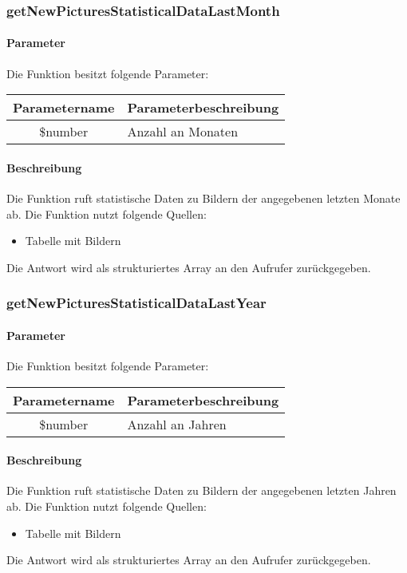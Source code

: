 \subsubsection{getNewPicturesStatisticalDataLastMonth}
\paragraph{Parameter} Die Funktion besitzt folgende Parameter:
\begin{table}[H]
	\begin{tabular}{|c|p{11cm}|}
		\hline
		\textbf{Parametername} & \textbf{Parameterbeschreibung} \\ \hline
		\$number & Anzahl an Monaten \\ \hline
	\end{tabular}
\end{table}
\paragraph{Beschreibung} Die Funktion ruft statistische Daten zu Bildern der angegebenen letzten Monate ab. Die Funktion nutzt folgende Quellen:
\begin{itemize}
	\item Tabelle mit Bildern
\end{itemize}
Die Antwort wird als strukturiertes Array an den Aufrufer zurückgegeben.
\subsubsection{getNewPicturesStatisticalDataLastYear}
\paragraph{Parameter} Die Funktion besitzt folgende Parameter:
\begin{table}[H]
	\begin{tabular}{|c|p{11cm}|}
		\hline
		\textbf{Parametername} & \textbf{Parameterbeschreibung} \\ \hline
		\$number & Anzahl an Jahren \\ \hline
	\end{tabular}
\end{table}
\paragraph{Beschreibung} Die Funktion ruft statistische Daten zu Bildern der angegebenen letzten Jahren ab. Die Funktion nutzt folgende Quellen:
\begin{itemize}
	\item Tabelle mit Bildern
\end{itemize}
Die Antwort wird als strukturiertes Array an den Aufrufer zurückgegeben.
